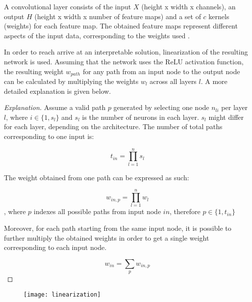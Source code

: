 A convolutional layer consists of the input $X$ (height x width x channels), an output $H$ (height x width x number of feature maps) and a  set of $c$ kernels (weights) for each feature map. The obtained feature maps represent different aspects of the input data, corresponding to the weights used \parencite{liSurveyConvolutionalNeural2022}.


In order to reach arrive at an interpretable solution, linearization of the resulting network is used. Assuming that the network uses the ReLU activation function, the resulting weight $w_{path}$ for any path from an input node to the output node can be calculated by multiplying the weights $w_l$ across all layers $l$. A more detailed explanation is given below.

\begin{proof}[Explanation]
Assume a valid path $p$ generated by selecting one node $n_{li}$ per layer $l$, where $i \in \{1, s_l\}$ and $s_l$ is the number of neurons in each layer. $s_l$ might differ for each layer, depending on the architecture. The number of total paths corresponding to one input is:

\begin{equation}
	t_{in} = \prod_{l=1}^n s_l
\end{equation} 

The weight obtained from one path can be expressed as such:

\begin{equation}
	w_{in, p} = \prod_{l=1}^{n} w_{l}
\end{equation}
, where $p$ indexes all possible paths from input node $in$, therefore $p \in \{1, t_{in}\}$

Moreover, for each path starting from the same input node, it is possible to further multiply the obtained weights in order to get a single weight corresponding to each input node.

\begin{equation}
	w_{in} = \sum_p w_{in, p}
\end{equation}

\end{proof}

\begin{figure}[ht]
	\centering
	\texttt{[image: linearization]}
	\caption{\parencite{keshishianEstimatingInterpretingNonlinear2020}}
\end{figure}

